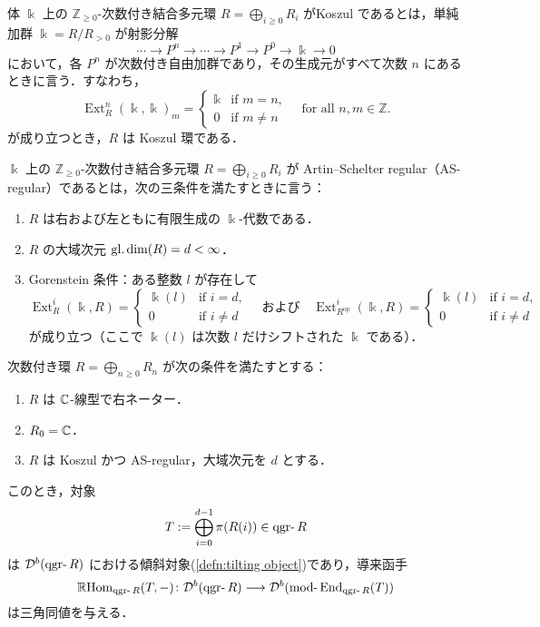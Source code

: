 \begin{defn}[Koszul 環]
体 $\Bbbk$ 上の $\mathbb{Z}_{\geq 0}$-次数付き結合多元環 $R = \bigoplus_{i \geq 0} R_i$ がKoszul であるとは，単純加群 $\Bbbk = R / R_{>0}$ が射影分解
\[
\cdots \to P^n \to \cdots \to P^1 \to P^0 \to \Bbbk \to 0
\]
において，各 $P^n$ が次数付き自由加群であり，その生成元がすべて次数 $n$ にあるときに言う．すなわち，
\[
\operatorname{Ext}^n_R(\Bbbk, \Bbbk)_m = 
\begin{cases}
\Bbbk & \text{if } m = n, \\
0 & \text{if } m \ne n
\end{cases}
\quad \text{for all } n, m \in \mathbb{Z}.
\]
が成り立つとき，$R$ は Koszul 環である．
\end{defn}

\begin{defn}
$\Bbbk$ 上の $\mathbb{Z}_{\geq 0}$-次数付き結合多元環 $R = \bigoplus_{i \geq 0} R_i$ が Artin--Schelter regular（AS-regular）であるとは，次の三条件を満たすときに言う：
\begin{enumerate}
  \item $R$ は右および左ともに有限生成の $\Bbbk$-代数である．
  \item $R$ の大域次元 $\operatorname{\mathrm{gl.dim}}(R) = d < \infty$．
  \item Gorenstein 条件：ある整数 $l$ が存在して
  \[
  \operatorname{Ext}^i_R(\Bbbk, R) = 
  \begin{cases}
  \Bbbk(l) & \text{if } i = d, \\
  0 & \text{if } i \ne d
  \end{cases}
  \quad \text{および} \quad
  \operatorname{Ext}^i_{R^\mathrm{op}}(\Bbbk, R) = 
  \begin{cases}
  \Bbbk(l) & \text{if } i = d, \\
  0 & \text{if } i \ne d
  \end{cases}
  \]
  が成り立つ（ここで $\Bbbk(l)$ は次数 $l$ だけシフトされた $\Bbbk$ である）．
\end{enumerate}
\end{defn}

\begin{thm}
\label{thm:tilting_qgr}
次数付き環 \(R = \bigoplus_{n \ge 0} R_n\) が次の条件を満たすとする：

\begin{enumerate}
  \item \(R\) は \({\mathbb C}\)-線型で右ネーター．
  \item \(R_0 = {\mathbb C}\)．
  \item \(R\) は Koszul かつ AS-regular，大域次元を \(d\) とする．
\end{enumerate}

このとき，対象
\[
T := \bigoplus_{i=0}^{d-1} \pi(R(i)) \in \qgr R
\]
は \(\D^b(\qgr R)\) における傾斜対象(\ref{defn:tilting object})であり，導来函手
\[
\RHom_{\qgr R}(T, -) \colon \D^b(\qgr R) \longrightarrow \D^b(\mod \End_{\qgr R}(T))
\]
は三角同値を与える．
\end{thm}

